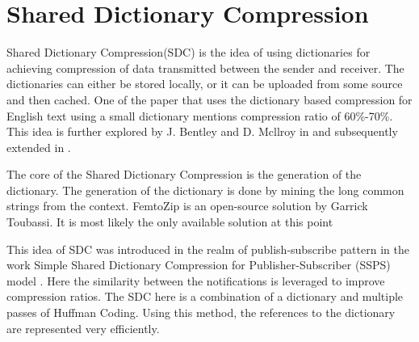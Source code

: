 \section{Shared Dictionary Compression}

Shared Dictionary Compression(SDC) is the idea of using dictionaries for achieving compression of data transmitted between the sender and receiver. The dictionaries can either be stored locally, or it can be uploaded from some source and then cached. One of the paper\parencite{Bell:1989:MTC:76894.76896} that uses the dictionary based compression for English text using a small dictionary mentions compression ratio of 60\%-70\%. This idea is further explored by J. Bentley and D. Mcllroy in \parencite{755678} and subsequently extended in \parencite{Bentley:2001:DCL:508081.508083}.

The core of the Shared Dictionary Compression is the generation of the dictionary. The generation of the dictionary is done by mining the long common strings from the context. FemtoZip \parencite{femtozip} is an open-source solution by Garrick Toubassi. It is most likely the only available solution at this point \parencite{sdc_linkedin}

This idea of SDC was introduced in the realm of publish-subscribe pattern in the work Simple Shared Dictionary Compression for Publisher-Subscriber (SSPS) model \parencite{Doblander:2016:SDC}. Here the similarity between the notifications is leveraged to improve compression ratios. The SDC here is a combination of a dictionary and multiple passes of Huffman Coding. Using this method, the references to the dictionary are represented very efficiently. 